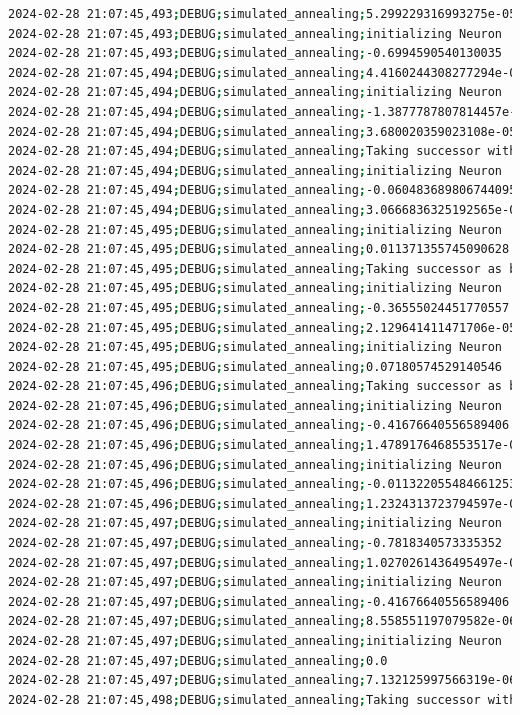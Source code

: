 \documentclass{article}
\begin{document}
\begin{lstlisting}[language=bash, caption=Example Output of Program]
2024-02-28 21:07:45,493;DEBUG;simulated_annealing;5.299229316993275e-05
2024-02-28 21:07:45,493;DEBUG;simulated_annealing;initializing Neuron
2024-02-28 21:07:45,493;DEBUG;simulated_annealing;-0.6994590540130035
2024-02-28 21:07:45,494;DEBUG;simulated_annealing;4.4160244308277294e-05
2024-02-28 21:07:45,494;DEBUG;simulated_annealing;initializing Neuron
2024-02-28 21:07:45,494;DEBUG;simulated_annealing;-1.3877787807814457e-16
2024-02-28 21:07:45,494;DEBUG;simulated_annealing;3.680020359023108e-05
2024-02-28 21:07:45,494;DEBUG;simulated_annealing;Taking successor with probability 99% (exploration)
2024-02-28 21:07:45,494;DEBUG;simulated_annealing;initializing Neuron
2024-02-28 21:07:45,494;DEBUG;simulated_annealing;-0.060483689806744095
2024-02-28 21:07:45,494;DEBUG;simulated_annealing;3.0666836325192565e-05
2024-02-28 21:07:45,495;DEBUG;simulated_annealing;initializing Neuron
2024-02-28 21:07:45,495;DEBUG;simulated_annealing;0.011371355745090628
2024-02-28 21:07:45,495;DEBUG;simulated_annealing;Taking successor as better option (exploitation)
2024-02-28 21:07:45,495;DEBUG;simulated_annealing;initializing Neuron
2024-02-28 21:07:45,495;DEBUG;simulated_annealing;-0.36555024451770557
2024-02-28 21:07:45,495;DEBUG;simulated_annealing;2.129641411471706e-05
2024-02-28 21:07:45,495;DEBUG;simulated_annealing;initializing Neuron
2024-02-28 21:07:45,495;DEBUG;simulated_annealing;0.07180574529140546
2024-02-28 21:07:45,496;DEBUG;simulated_annealing;Taking successor as better option (exploitation)
2024-02-28 21:07:45,496;DEBUG;simulated_annealing;initializing Neuron
2024-02-28 21:07:45,496;DEBUG;simulated_annealing;-0.41676640556589406
2024-02-28 21:07:45,496;DEBUG;simulated_annealing;1.4789176468553517e-05
2024-02-28 21:07:45,496;DEBUG;simulated_annealing;initializing Neuron
2024-02-28 21:07:45,496;DEBUG;simulated_annealing;-0.011322055484661253
2024-02-28 21:07:45,496;DEBUG;simulated_annealing;1.2324313723794597e-05
2024-02-28 21:07:45,497;DEBUG;simulated_annealing;initializing Neuron
2024-02-28 21:07:45,497;DEBUG;simulated_annealing;-0.7818340573335352
2024-02-28 21:07:45,497;DEBUG;simulated_annealing;1.0270261436495497e-05
2024-02-28 21:07:45,497;DEBUG;simulated_annealing;initializing Neuron
2024-02-28 21:07:45,497;DEBUG;simulated_annealing;-0.41676640556589406
2024-02-28 21:07:45,497;DEBUG;simulated_annealing;8.558551197079582e-06
2024-02-28 21:07:45,497;DEBUG;simulated_annealing;initializing Neuron
2024-02-28 21:07:45,497;DEBUG;simulated_annealing;0.0
2024-02-28 21:07:45,497;DEBUG;simulated_annealing;7.132125997566319e-06
2024-02-28 21:07:45,498;DEBUG;simulated_annealing;Taking successor with probability 100% (exploration)

\end{lstlisting}
\end{document}
